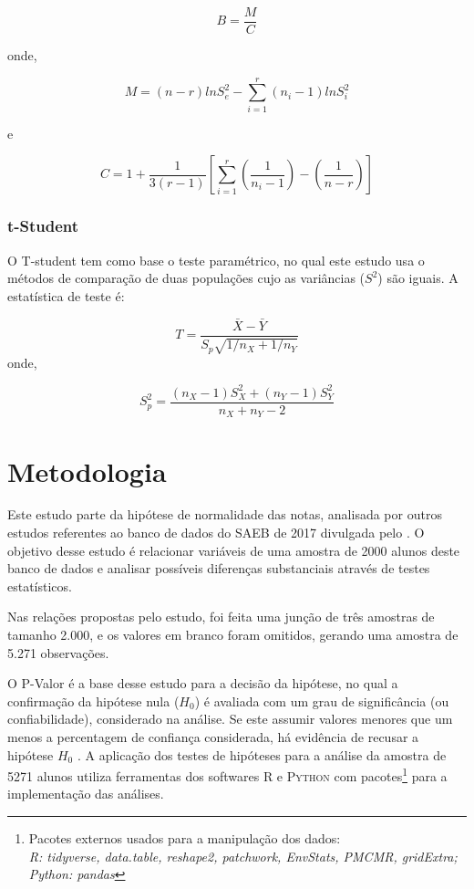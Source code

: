 $$B = \frac{M}{C}$$

onde,

$$M = (n-r)lnS^2_e - \sum_{i=1}^{r} (n_i - 1)lnS_i^2$$  

e

$$C = 1+ \frac{1}{3(r-1)}\left[\sum_{i=1}^{r} \left( \frac{1}{n_i-1}\right) - \left(\frac{1}{n-r} \right) \right]$$




\subsection{t-Student}

O T-student \cite{o1908student} tem como base o teste paramétrico, no qual este estudo usa o métodos de comparação de duas populações cujo as variâncias ($S^2$) são iguais. A estatística de teste é:

$$T = \frac{\bar{X}-\bar{Y}}{S_p\sqrt{1/n_X + 1/n_Y}}$$
onde,

$$S_p^2 = \frac{(n_X-1)S_X^2 + (n_Y-1)S_Y^2}{n_X + n_Y -2}$$





\chapter{Metodologia}

Este estudo parte da hipótese de normalidade das notas, analisada por outros estudos
referentes ao banco de dados do SAEB de 2017 divulgada pelo .
O objetivo desse estudo é relacionar variáveis de uma amostra de 2000 alunos deste
banco de dados e analisar possíveis diferenças substanciais através de testes estatísticos.

Nas relações propostas pelo estudo, foi feita uma junção de três amostras de tamanho 2.000, 
e os valores em branco foram omitidos, gerando uma amostra de 5.271 observações.

O P-Valor é a base desse estudo para a decisão da hipótese, no qual a confirmação da hipótese nula
($H_0$) é avaliada com um grau de significância (ou confiabilidade), considerado na análise.
Se este assumir valores menores que um menos a percentagem de confiança considerada,
há evidência de recusar a hipótese $H_0$ \cite[pag. 364]{morettin2017estatistica}.
A aplicação dos testes de hipóteses para a análise da amostra de 5271 alunos utiliza ferramentas
dos softwares \textsc{R} e \textsc{Python}
com pacotes\footnote{Pacotes externos usados para a manipulação dos dados:\\\textit{R: tidyverse, data.table, reshape2, patchwork, EnvStats, PMCMR, gridExtra; \\Python: pandas}}
para a implementação das análises.


